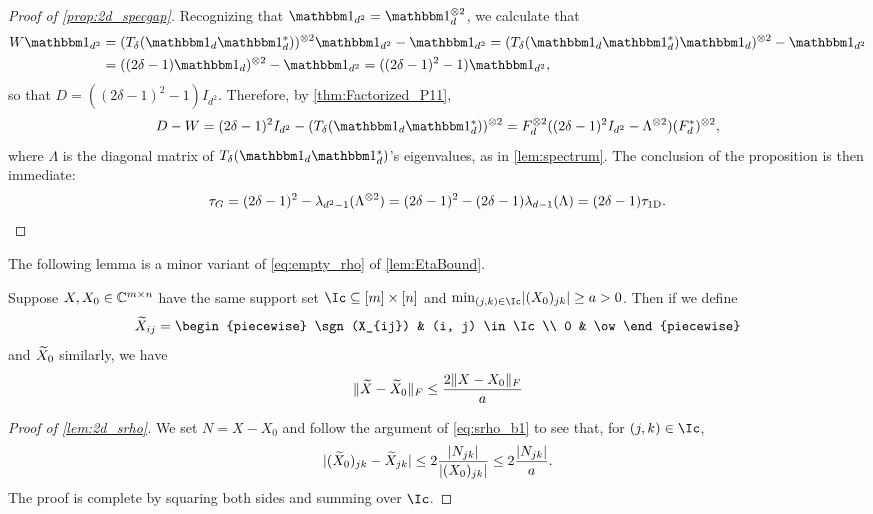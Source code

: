 \begin{proof}[Proof of \cref{prop:2d_specgap}]
  Recognizing that $\one_{d^2} = \one_d^{\kron 2}$, we calculate that
  \begin{align*}
    W \one_{d^2} &= (T_\delta(\one_d \one_d^*))^{\kron 2} \one_{d^2} - \one_{d^2} = (T_\delta(\one_d \one_d^*) \one_d)^{\kron 2} - \one_{d^2} \\
    &= ((2 \delta - 1) \one_d)^{\kron 2} - \one_{d^2} = ((2 \delta - 1)^2 - 1) \one_{d^2},
  \end{align*}
  so that $D = ((2 \delta - 1)^2 - 1) I_{d^2}$.  Therefore, by \cref{thm:Factorized_P11}, \[D - W = (2 \delta - 1)^2 I_{d^2} - (T_\delta(\one_d \one_d^*))^{\kron 2} = F_d^{\kron 2} ((2 \delta - 1)^2 I_{d^2} - \Lambda^{\kron 2}) (F_d^*)^{\kron 2},\] where $\Lambda$ is the diagonal matrix of $T_\delta(\one_d \one_d^*)$'s eigenvalues, as in \cref{lem:spectrum}.  The conclusion of the proposition is then immediate: \[\tau_G = (2 \delta - 1)^2 - \lambda_{d^2 - 1}(\Lambda^{\otimes 2}) = (2 \delta - 1)^2 - (2 \delta - 1) \lambda_{d - 1}(\Lambda) = (2 \delta - 1) \tau_{\rm 1D}.\]
\end{proof}
The following lemma is a minor variant of \eqref{eq:empty_rho} of \cref{lem:EtaBound}.
\begin{lemma}
  Suppose $X, X_0 \in \mathbb{C}^{m \times n}$ have the same support set $\Ic \subset [m] \times [n]$ and $\min_{(j, k) \in \Ic} \abs{(X_0)_{jk}} \ge a > 0$.  Then if we define \[\tX_{ij} = \begin{piecewise} \sgn(X_{ij}) & (i, j) \in \Ic \\ 0 & \ow \end{piecewise}\] and $\widetilde{X}_0$ similarly, we have \[\lVert\widetilde{X} - \widetilde{X}_0\rVert_F \le \frac{2 \lVert X - X_0\rVert_F}{a}\]
  \label{lem:2d_srho}
\end{lemma}

\begin{proof}[Proof of \cref{lem:2d_srho}]
  We set $N = X - X_0$ and follow the argument of \eqref{eq:srho_b1} to see that, for $(j, k) \in \Ic$, \[\lvert(\widetilde{X}_0)_{jk} - \widetilde{X}_{jk}\rvert \le 2 \dfrac{\lvert N_{jk}\rvert}{\lvert(X_0)_{jk}\rvert} \le 2 \dfrac{\lvert N_{jk}\rvert}{a}.\]  The proof is complete by squaring both sides and summing over $\Ic$.
\end{proof}

